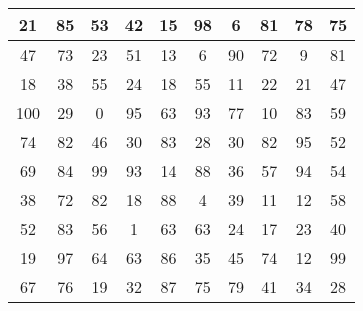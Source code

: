 \documentclass[11pt]{article}
\begin{document}
\begin{center}

\begin{tabular}{| c | c | c | c | c | c | c | c | c | c |}
\hline
21 & 85 & 53 & 42 & 15 & 98 & 6 & 81 & 78 & 75\\
\hline

47 & 73 & 23 & 51 & 13 & 6 & 90 & 72 & 9 & 81\\
\hline

18 & 38 & 55 & 24 & 18 & 55 & 11 & 22 & 21 & 47\\
\hline

100 & 29 & 0 & 95 & 63 & 93 & 77 & 10 & 83 & 59\\
\hline

74 & 82 & 46 & 30 & 83 & 28 & 30 & 82 & 95 & 52\\
\hline

69 & 84 & 99 & 93 & 14 & 88 & 36 & 57 & 94 & 54\\
\hline

38 & 72 & 82 & 18 & 88 & 4 & 39 & 11 & 12 & 58\\
\hline

52 & 83 & 56 & 1 & 63 & 63 & 24 & 17 & 23 & 40\\
\hline

19 & 97 & 64 & 63 & 86 & 35 & 45 & 74 & 12 & 99\\
\hline

67 & 76 & 19 & 32 & 87 & 75 & 79 & 41 & 34 & 28\\
\hline

\end{tabular}

\end{center}
\end{document}
